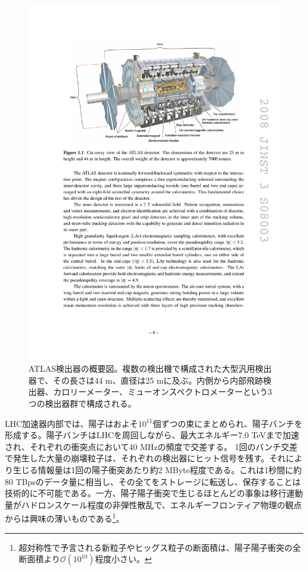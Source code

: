 \begin{figure} 
    \centering
    \includegraphics[width=16cm]{fig/Intro/ATLASdetector.pdf}
    \caption[ATLAS検出器の概要]{ATLAS検出器の概要図\cite{JINST:2008}。複数の検出機で構成された大型汎用検出器で、その長さは44 m、直径は25 mに及ぶ。内側から内部飛跡検出器、カロリーメーター、ミューオンスペクトロメーターという3つの検出器群で構成される。}
    \label{ATLASdetector}
\end{figure}

LHC加速器内部では、陽子はおよそ$10 ^ {11}$個ずつの束にまとめられ、陽子バンチを形成する。陽子バンチはLHCを周回しながら、最大エネルギー7.0 TeVまで加速され、それぞれの衝突点において40 MHzの頻度で交差する。
1回のバンチ交差で発生した大量の崩壊粒子は、それぞれの検出器にヒット信号を残す。それにより生じる情報量は1回の陽子衝突あたり約2 MByte程度である。これは1秒間に約80 TBpsのデータ量に相当し、その全てをストレージに転送し、保存することは技術的に不可能である。一方、陽子陽子衝突で生じるほとんどの事象は移行運動量がハドロンスケール程度の非弾性散乱で、エネルギーフロンティア物理の観点からは興味の薄いものである\footnote{超対称性で予言される新粒子やヒッグス粒子の断面積は、陽子陽子衝突の全断面積より$\mathcal{O}(10^{10})$程度小さい。}。

